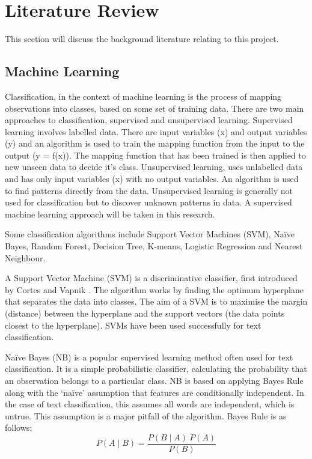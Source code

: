 \chapter{Literature Review}

This section will discuss the background literature relating to this project.

\section{Machine Learning}

Classification, in the context of machine learning is the process of mapping observations into classes, based on some set of training data. There are two main approaches to classification, supervised and unsupervised learning. Supervised learning involves labelled data. There are input variables (x) and output variables (y) and an algorithm is used to train the mapping function from the input to the output (y = f(x)). The mapping function that has been trained is then applied to new unseen data to decide it's class. Unsupervised learning, uses unlabelled data and has only input variables (x) with no output variables. An algorithm is used to find patterns directly from the data. Unsupervised learning is generally not used for classification but to discover unknown patterns in data. A supervised machine learning approach will be taken in this research.

Some classification algorithms include Support Vector Machines (SVM), Naïve Bayes, Random Forest, Decision Tree, K-means, Logistic Regression and Nearest Neighbour.

A Support Vector Machine (SVM) is a discriminative classifier, first introduced by Cortes and Vapnik \cite{Vapnik1995,Vapnik21995}. The algorithm works by finding the optimum hyperplane that separates the data into classes. The aim of a SVM is to maximise the margin (distance) between the hyperplane and the support vectors (the data points closest to the hyperplane). SVMs have been used successfully for text classification.

Naïve Bayes (NB) is a popular supervised learning method often used for text classification. It is a simple probabilistic classifier, calculating the probability that an observation belongs to a particular class. NB is based on applying Bayes Rule along with the ‘naïve’ assumption that features are conditionally independent. In the case of text classification, this assumes all words are independent, which is untrue. This assumption is a major pitfall of the algorithm. Bayes Rule is as follows:  \[P(A\mid B)=\frac{P(B\mid A)\:P(A)}{P(B)}\] 

